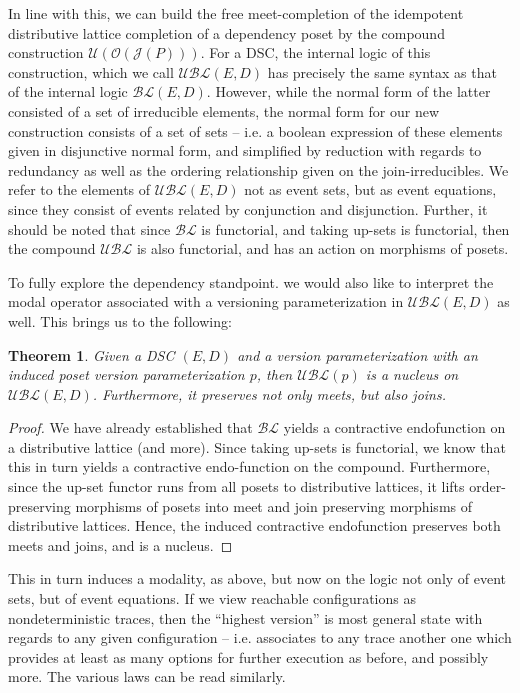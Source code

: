 \documentclass[hoptionsi,review,screen,format=acmsmall]{acmart}
\newtheorem{theorem}{Theorem}[section]
\theoremstyle{definition}
\newcommand{\UBLc}{\mathcal{UBL}}
\newcommand{\Oc}{\mathcal{O}}
\newcommand{\Ucc}{\mathcal{U}}
\newcommand{\Jc}{\mathcal{J}}
\newcommand{\BLc}{\mathcal{BL}}
\begin{document}
 In line with this, we can build the free meet-completion of the idempotent distributive lattice completion of a dependency poset by the compound construction \(\Ucc(\Oc(\Jc(P)))\). For a DSC, the internal logic of this construction, which we call \(\UBLc(E,D)\) has precisely the same syntax as that of the internal logic \(\BLc(E,D)\). However, while the normal form of the latter consisted of a set of irreducible elements, the normal form for our new construction consists of a set of sets -- i.e. a boolean expression of these elements given in disjunctive normal form, and simplified by reduction with regards to redundancy as well as the ordering relationship given on the join-irreducibles. We refer to the elements of \(\UBLc(E,D)\) not as event sets, but as event equations, since they consist of events related by conjunction and disjunction. Further, it should be noted that since \(\BLc\) is functorial, and taking up-sets is functorial, then the compound \(\UBLc\) is also functorial, and has an action on morphisms of posets.
 


To fully explore the dependency standpoint. we would also like to interpret the modal operator associated with a versioning parameterization in \(\UBLc(E,D)\) as well. This brings us to the following:

\begin{theorem}
Given a DSC \((E,D)\) and a version parameterization with an induced poset version parameterization \(p\), then \(\UBLc(p)\) is a nucleus on \(\UBLc(E,D)\). Furthermore, it preserves not only meets, but also joins.
\end{theorem}
\begin{proof}
We have already established that \(\BLc\) yields a contractive endofunction on a distributive lattice (and more). Since taking up-sets is functorial, we know that this in turn yields a contractive endo-function on the compound. Furthermore, since the up-set functor runs from all posets to distributive lattices, it lifts order-preserving morphisms of posets into meet and join preserving morphisms of distributive lattices. Hence, the induced contractive endofunction preserves both meets and joins, and is a nucleus.
\end{proof}

This in turn induces a modality, as above, but now on the logic not only of event sets, but of event equations. If we view reachable configurations as nondeterministic traces, then the ``highest version'' is most general state with regards to any given configuration -- i.e. associates to any trace another one which provides at least as many options for further execution as before, and possibly more. The various laws can be read similarly. %
\end{document}

